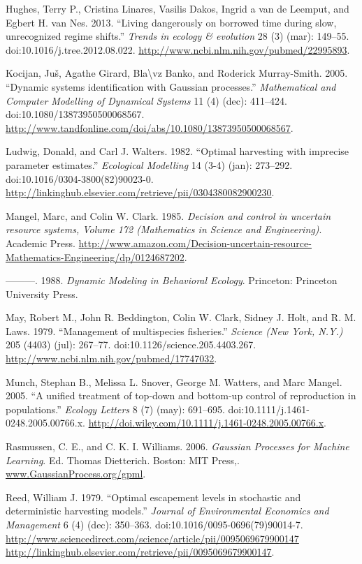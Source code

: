 \documentclass[author-year, review]{elsarticle} %
\begin{document}
Hughes, Terry P., Cristina Linares, Vasilis Dakos, Ingrid a van de
Leemput, and Egbert H. van Nes. 2013. ``Living dangerously on borrowed
time during slow, unrecognized regime shifts.'' \emph{Trends in ecology
\& evolution} 28 (3) (mar): 149--55. doi:10.1016/j.tree.2012.08.022.
\url{http://www.ncbi.nlm.nih.gov/pubmed/22995893}.

Kocijan, Juš, Agathe Girard, Bla\textbackslash{}vz Banko, and Roderick
Murray-Smith. 2005. ``Dynamic systems identification with Gaussian
processes.'' \emph{Mathematical and Computer Modelling of Dynamical
Systems} 11 (4) (dec): 411--424. doi:10.1080/13873950500068567.
\url{http://www.tandfonline.com/doi/abs/10.1080/13873950500068567}.

Ludwig, Donald, and Carl J. Walters. 1982. ``Optimal harvesting with
imprecise parameter estimates.'' \emph{Ecological Modelling} 14 (3-4)
(jan): 273--292. doi:10.1016/0304-3800(82)90023-0.
\url{http://linkinghub.elsevier.com/retrieve/pii/0304380082900230}.

Mangel, Marc, and Colin W. Clark. 1985. \emph{Decision and control in
uncertain resource systems, Volume 172 (Mathematics in Science and
Engineering)}. Academic Press.
\url{http://www.amazon.com/Decision-uncertain-resource-Mathematics-Engineering/dp/0124687202}.

---------. 1988. \emph{Dynamic Modeling in Behavioral Ecology}.
Princeton: Princeton University Press.

May, Robert M., John R. Beddington, Colin W. Clark, Sidney J. Holt, and
R. M. Laws. 1979. ``Management of multispecies fisheries.''
\emph{Science (New York, N.Y.)} 205 (4403) (jul): 267--77.
doi:10.1126/science.205.4403.267.
\url{http://www.ncbi.nlm.nih.gov/pubmed/17747032}.

Munch, Stephan B., Melissa L. Snover, George M. Watters, and Marc
Mangel. 2005. ``A unified treatment of top-down and bottom-up control of
reproduction in populations.'' \emph{Ecology Letters} 8 (7) (may):
691--695. doi:10.1111/j.1461-0248.2005.00766.x.
\url{http://doi.wiley.com/10.1111/j.1461-0248.2005.00766.x}.

Rasmussen, C. E., and C. K. I. Williams. 2006. \emph{Gaussian Processes
for Machine Learning}. Ed. Thomas Dietterich. Boston: MIT Press,.
\url{www.GaussianProcess.org/gpml}.

Reed, William J. 1979. ``Optimal escapement levels in stochastic and
deterministic harvesting models.'' \emph{Journal of Environmental
Economics and Management} 6 (4) (dec): 350--363.
doi:10.1016/0095-0696(79)90014-7.
\href{http://www.sciencedirect.com/science/article/pii/0095069679900147 http://linkinghub.elsevier.com/retrieve/pii/0095069679900147}{http://www.sciencedirect.com/science/article/pii/0095069679900147
http://linkinghub.elsevier.com/retrieve/pii/0095069679900147}.
\end{document}
